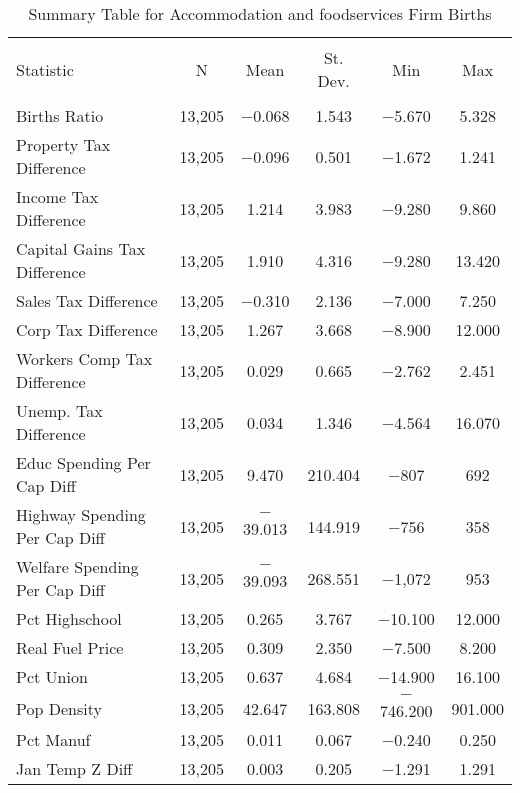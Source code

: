 
\begin{table}[!htbp] \centering 
  \caption{Summary Table for  Accommodation and foodservices Firm Births} 
  \label{72summary} 
\begin{tabular}{@{\extracolsep{5pt}}lccccc} 
\\[-1.8ex]\hline 
\hline \\[-1.8ex] 
Statistic & \multicolumn{1}{c}{N} & \multicolumn{1}{c}{Mean} & \multicolumn{1}{c}{St. Dev.} & \multicolumn{1}{c}{Min} & \multicolumn{1}{c}{Max} \\ 
\hline \\[-1.8ex] 
Births Ratio & 13,205 & $-$0.068 & 1.543 & $-$5.670 & 5.328 \\ 
Property Tax Difference & 13,205 & $-$0.096 & 0.501 & $-$1.672 & 1.241 \\ 
Income Tax Difference & 13,205 & 1.214 & 3.983 & $-$9.280 & 9.860 \\ 
Capital Gains Tax Difference & 13,205 & 1.910 & 4.316 & $-$9.280 & 13.420 \\ 
Sales Tax Difference & 13,205 & $-$0.310 & 2.136 & $-$7.000 & 7.250 \\ 
Corp Tax Difference & 13,205 & 1.267 & 3.668 & $-$8.900 & 12.000 \\ 
Workers Comp Tax Difference & 13,205 & 0.029 & 0.665 & $-$2.762 & 2.451 \\ 
Unemp. Tax Difference & 13,205 & 0.034 & 1.346 & $-$4.564 & 16.070 \\ 
Educ Spending Per Cap Diff & 13,205 & 9.470 & 210.404 & $-$807 & 692 \\ 
Highway Spending Per Cap Diff & 13,205 & $-$39.013 & 144.919 & $-$756 & 358 \\ 
Welfare Spending Per Cap Diff & 13,205 & $-$39.093 & 268.551 & $-$1,072 & 953 \\ 
Pct Highschool & 13,205 & 0.265 & 3.767 & $-$10.100 & 12.000 \\ 
Real Fuel Price & 13,205 & 0.309 & 2.350 & $-$7.500 & 8.200 \\ 
Pct Union & 13,205 & 0.637 & 4.684 & $-$14.900 & 16.100 \\ 
Pop Density & 13,205 & 42.647 & 163.808 & $-$746.200 & 901.000 \\ 
Pct Manuf & 13,205 & 0.011 & 0.067 & $-$0.240 & 0.250 \\ 
Jan Temp Z Diff & 13,205 & 0.003 & 0.205 & $-$1.291 & 1.291 \\ 

\end{tabular}
\end{table}
